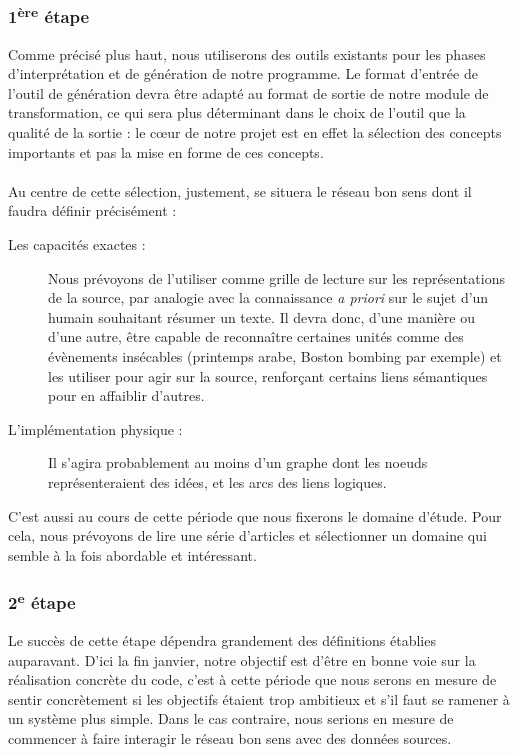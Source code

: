 \documentclass{article}           %
\begin{document}
\subsubsection{1\textsuperscript{ère} étape}

Comme précisé plus haut, nous utiliserons des outils existants pour les phases d'interprétation et de génération de notre programme. Le format d'entrée de l'outil de génération devra \^{e}tre adapté au format de sortie de notre module de transformation, ce qui sera plus déterminant dans le choix de l'outil que la qualité de la sortie : le cœur de notre projet est en effet la sélection des concepts importants et pas la mise en forme de ces concepts.

\paragraph{}
Au centre de cette sélection, justement, se situera le réseau bon sens dont il faudra définir précisément :
\begin{description}
	\item[Les capacités exactes :]Nous prévoyons de l'utiliser comme grille de lecture sur les représentations de la source, par analogie avec la connaissance \textit{a priori} sur le sujet d'un humain souhaitant résumer un texte. Il devra donc, d'une manière ou d'une autre, \^{e}tre capable de reconna\^{i}tre certaines unités comme des évènements insécables (printemps arabe, Boston bombing par exemple) et les utiliser pour agir sur la source, renforçant certains liens sémantiques pour en affaiblir d'autres.
	\item[L'implémentation physique :]Il s'agira probablement au moins d'un graphe dont les noeuds représenteraient des idées, et les arcs des liens logiques.
\end{description}

C'est aussi au cours de cette période que nous fixerons le domaine d'étude. Pour cela, nous prévoyons de lire une série d'articles et sélectionner un domaine qui semble à la fois abordable et intéressant.

\subsubsection{2\textsuperscript{e} étape}

Le succès de cette étape dépendra grandement des définitions établies auparavant. D'ici la fin janvier, notre objectif est d'\^{e}tre en bonne voie sur la réalisation concrète du code, c'est à cette période que nous serons en mesure de sentir concrètement si les objectifs étaient trop ambitieux et s'il faut se ramener à un système plus simple. Dans le cas contraire, nous serions en mesure de commencer à faire interagir le réseau bon sens avec des données sources.
\end{document}
